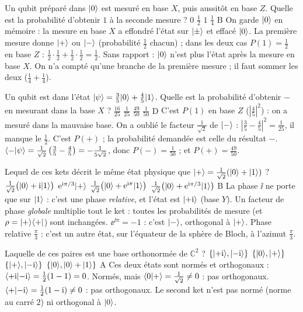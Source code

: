   {Un qubit préparé dans $|0\rangle$ est mesuré en base $X$, puis aussitôt en base $Z$. Quelle est la probabilité d'obtenir $1$ à la seconde mesure ?}
  {$0$}
  {$\frac12$}
  {$1$}
  {$\frac14$}
  {B}
\qcmx
  {On garde $|0\rangle$ en mémoire : la mesure en base $X$ a effondré l'état sur $|\pm\rangle$ et effacé $|0\rangle$.}
  {La première mesure donne $|+\rangle$ ou $|-\rangle$ (probabilité $\frac12$ chacun) ; dans les deux cas $P(1)=\frac12$ en base $Z$ : $\frac12\cdot\frac12+\frac12\cdot\frac12=\frac12$.}
  {Sans rapport : $|0\rangle$ n'est plus l'état après la mesure en base $X$.}
  {On n'a compté qu'une branche de la première mesure ; il faut sommer les deux ($\frac14+\frac14$).}

  {Un qubit est dans l'état $|\psi\rangle=\frac{3}{5}|0\rangle+\frac{4}{5}|1\rangle$. Quelle est la probabilité d'obtenir $-$ en mesurant dans la base $X$ ?}
  {$\frac{16}{25}$}
  {$\frac{1}{25}$}
  {$\frac{49}{50}$}
  {$\frac{1}{50}$}
  {D}
\qcmx
  {C'est $P(1)$ en base $Z$ ($|\frac45|^2$) : on a mesuré dans la mauvaise base.}
  {On a oublié le facteur $\frac{1}{\sqrt2}$ de $|-\rangle$ : $\left|\frac35-\frac45\right|^2=\frac1{25}$, il manque le $\frac12$.}
  {C'est $P(+)$ ; la probabilité demandée est celle du résultat $-$.}
  {$\langle -|\psi\rangle=\frac{1}{\sqrt2}\left(\frac35-\frac45\right)=-\frac{1}{5\sqrt2}$, donc $P(-)=\frac1{50}$ ; et $P(+)=\frac{49}{50}$.}

  {Lequel de ces kets décrit le même état physique que $|+\rangle=\frac{1}{\sqrt2}(|0\rangle+|1\rangle)$ ?}
  {$\frac{1}{\sqrt2}\big(|0\rangle+\mathrm{i}|1\rangle\big)$}
  {$\mathrm{e}^{\mathrm{i}\pi/3}|+\rangle$}
  {$\frac{1}{\sqrt2}\big(|0\rangle+\mathrm{e}^{\mathrm{i}\pi}|1\rangle\big)$}
  {$\frac{1}{\sqrt2}\big(|0\rangle+\mathrm{e}^{\mathrm{i}\pi/3}|1\rangle\big)$}
  {B}
\qcmx
  {La phase $\ii$ ne porte que sur $|1\rangle$ : c'est une phase \emph{relative}, et l'état est $|{+}\mathrm{i}\rangle$ (base $Y$).}
  {Un facteur de phase \emph{globale} multiplie tout le ket : toutes les probabilités de mesure (et $\rho=|+\rangle\langle +|$) sont inchangées.}
  {$\ee^{\ii\pi}=-1$ : c'est $|-\rangle$, orthogonal à $|+\rangle$.}
  {Phase relative $\frac\pi3$ : c'est un autre état, sur l'équateur de la sphère de Bloch, à l'azimut $\frac\pi3$.}

  {Laquelle de ces paires est une base orthonormée de $\mathbb{C}^2$ ?}
  {$\{|{+}\mathrm{i}\rangle,|{-}\mathrm{i}\rangle\}$}
  {$\{|0\rangle,|+\rangle\}$}
  {$\{|+\rangle,|{-}\mathrm{i}\rangle\}$}
  {$\{|0\rangle,|0\rangle+|1\rangle\}$}
  {A}
\qcmx
  {Ces deux états sont normés et orthogonaux : $\langle {+}\mathrm{i}|{-}\mathrm{i}\rangle=\frac12(1-1)=0$.}
  {Normés, mais $\langle 0|+\rangle=\frac{1}{\sqrt2}\neq0$ : pas orthogonaux.}
  {$\langle +|{-}\mathrm{i}\rangle=\frac12(1-\mathrm{i})\neq0$ : pas orthogonaux.}
  {Le second ket n'est pas normé (norme au carré $2$) ni orthogonal à $|0\rangle$.}

